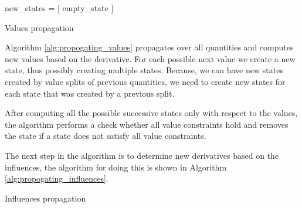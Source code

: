 \documentclass[a4paper]{article}
\begin{document}
\vspace{12pt}
\begin{algorithm}[H]
new\_states = [ empty\_state ]

\caption{Values propagation}
\label{alg:propogating_values}
\end{algorithm}
\vspace{12pt}

Algorithm \ref{alg:propogating_values} propagates over all quantities and computes new values based on the derivative. For each possible next value we create a new state, thus possibly creating multiple states. Because, we can have new states created by value splits of previous quantities, we need to create new states for each state that was created by a previous split.

After computing all the possible successive states only with respect to the values, the algorithm performs a check whether all value constraints hold and removes the state if a state does not satisfy all value constraints.

The next step in the algorithm is to determine new derivatives based on the influences, the algorithm for doing this is shown in Algorithm \ref{alg:propogating_influences}.

\vspace{12pt}
\begin{algorithm}[H]

\caption{Influences propagation}
\label{alg:propogating_influences}
\end{algorithm}
\vspace{12pt}
\end{document}
